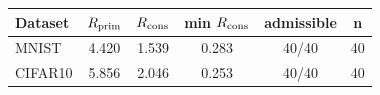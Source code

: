 \begin{tabular}{lccccc}\hline
Dataset & $R_{\rm prim}$ & $R_{\rm cons}$ & min $R_{\rm cons}$ & admissible & n \\\hline
MNIST & 4.420 & 1.539 & 0.283 & 40/40 & 40 \\
CIFAR10 & 5.856 & 2.046 & 0.253 & 40/40 & 40 \\
\hline\end{tabular}
